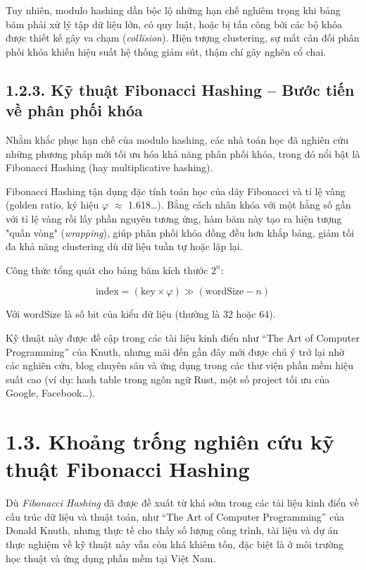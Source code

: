 \documentclass[12pt,a4paper]{report}
\begin{document}
Tuy nhiên, modulo hashing dần bộc lộ những hạn chế nghiêm trọng khi bảng băm phải xử lý tập dữ liệu lớn, có quy luật, hoặc bị tấn công bởi các bộ khóa được thiết kế gây va chạm (\textit{collision}). Hiện tượng clustering, sự mất cân đối phân phối khóa khiến hiệu suất hệ thống giảm sút, thậm chí gây nghẽn cổ chai.

\subsection*{1.2.3. Kỹ thuật Fibonacci Hashing – Bước tiến về phân phối khóa}
\noindent \indent Nhằm khắc phục hạn chế của modulo hashing, các nhà toán học đã nghiên cứu những phương pháp mới tối ưu hóa khả năng phân phối khóa, trong đó nổi bật là Fibonacci Hashing (hay multiplicative hashing).

Fibonacci Hashing tận dụng đặc tính toán học của dãy Fibonacci và tỉ lệ vàng (golden ratio, ký hiệu $\varphi$ $\approx$ 1.618…). Bằng cách nhân khóa với một hằng số gần với tỉ lệ vàng rồi lấy phần nguyên tương ứng, hàm băm này tạo ra hiện tượng "quấn vòng" (\textit{wrapping}), giúp phân phối khóa đồng đều hơn khắp bảng, giảm tối đa khả năng clustering dù dữ liệu tuần tự hoặc lặp lại.

Công thức tổng quát cho bảng băm kích thước $2^n$:

\[
\text{index} = \left( \text{key} \times \varphi \right) \gg (\text{wordSize} - n)
\]

Với wordSize là số bit của kiểu dữ liệu (thường là 32 hoặc 64).

Kỹ thuật này được đề cập trong các tài liệu kinh điển như “The Art of Computer Programming” của Knuth, nhưng mãi đến gần đây mới được chú ý trở lại nhờ các nghiên cứu, blog chuyên sâu và ứng dụng trong các thư viện phần mềm hiệu suất cao (ví dụ: hash table trong ngôn ngữ Rust, một số project tối ưu của Google, Facebook…).

\section*{1.3. Khoảng trống nghiên cứu kỹ thuật Fibonacci Hashing}
\noindent \indent Dù \textit{Fibonacci Hashing} đã được đề xuất từ khá sớm trong các tài liệu kinh điển về cấu trúc dữ liệu và thuật toán, như “The Art of Computer Programming” của Donald Knuth, nhưng thực tế cho thấy số lượng công trình, tài liệu và dự án thực nghiệm về kỹ thuật này vẫn còn khá khiêm tốn, đặc biệt là ở môi trường học thuật và ứng dụng phần mềm tại Việt Nam.
\end{document}
